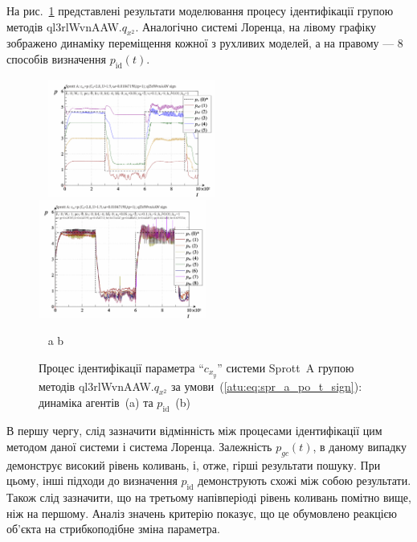 На рис.~\ref{atu:f:spr_a_id_ql3rlWvnAAW_q_x2_sign}
представлені результати моделювання процесу ідентифікації групою методів ql3rlWvnAAW.$q_{x^2}$.
Аналогічно системі Лоренца, на лівому графіку зображено
динаміку переміщення кожної з рухливих моделей, а на правому ---
8 способів визначення
$p_\mathrm{id} (t)$.

\begin{figure}[htb!]
 \begin{center}
    ~ \hfill
    \includegraphics[width=0.49\textwidth]{p/cha/spr_a/ql3rlWvnAAW_x2/sprott_a_id-p_t_pi_ql3rlWvnAAW_sign.png}
    \hfill
    \includegraphics[width=0.49\textwidth]{p/cha/spr_a/ql3rlWvnAAW_x2/sprott_a_id-p_t_p_ql3rlWvnAAW_sign.png}
    \hfill ~
  \end{center}
  \vspace{-2.2ex}
  \begin{center}
    ~ \hfill a \hfill\hfill b \hfill ~
  \end{center}
  \vspace{-1.0ex}
\caption{Процес ідентифікації параметра ``$c_{x_y}$'' системи Sprott~A групою методів ql3rlWvnAAW.$q_{x^2}$ за умови~(\ref{atu:eq:spr_a_po_t_sign}): динаміка агентів~(a) та $p_\mathrm{id}$~(b)}
  \label{atu:f:spr_a_id_ql3rlWvnAAW_q_x2_sign}
\end{figure}

В першу чергу, слід зазначити відмінність між процесами
ідентифікації цим методом даної системи і система Лоренца.
Залежність $p_{gc}(t)$, в даному випадку демонструє високий
рівень коливань, і, отже, гірші результати пошуку. При цьому, інші підходи до
визначення $p_\mathrm{id}$ демонструють схожі між собою результати.
Також слід зазначити, що на третьому напівперіоді рівень
коливань помітно вище, ніж на першому. Аналіз значень критерію
показує, що це обумовлено реакцією об'єкта на стрибкоподібне
зміна параметра.




